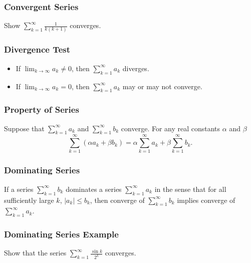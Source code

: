 \documentclass{beamer}
\begin{document}
  \begin{frame}[t]
   \frametitle{Convergent Series}
   \begin{Example}
   Show $\displaystyle\sum_{k = 1}^\infty \frac{1}{k(k + 1)}$ converges. 
   \end{Example}
  
  \end{frame}
 
 \begin{frame}
 \frametitle{Divergence Test}
 \begin{itemize}
\item If $\displaystyle\lim_{k\to\infty} a_k \neq 0$, then $\displaystyle\sum_{k = 1}^\infty a_k$ diverges.  
\item If $\displaystyle\lim_{k\to\infty} a_k =  0$, then $\displaystyle\sum_{k = 1}^\infty a_k$ may or may not converge.
\end{itemize}
 \end{frame}
 
 \begin{frame}
 \frametitle{Property of Series}
 
 \begin{Theorem} 
 Suppose that $\displaystyle\sum_{k = 1}^\infty a_k$ and $\displaystyle\sum_{k = 1}^\infty b_k$ converge. For any real constants $\alpha$ and $\beta$
 $$
 \sum_{k = 1}^\infty\left( \alpha a_k + \beta b_k\right) =   \alpha \sum_{k = 1}^\infty a_k + \beta \sum_{k = 1}^\infty b_k .
 $$
  \end{Theorem} 
 \end{frame}
 
 
 \begin{frame}
 \frametitle{Dominating Series}
 
 \begin{Theorem}
 If a series $\displaystyle\sum_{k = 1}^\infty b_k$ dominates a series $\displaystyle\sum_{k = 1}^\infty a_k$ in the sense that for all sufficiently large $k$, $|a_k| \leq b_k$, then converge of $\displaystyle\sum_{k = 1}^\infty b_k$ implies converge of $\displaystyle\sum_{k = 1}^\infty a_k$.
 \end{Theorem}
 
 \end{frame}
 
 \begin{frame}[t]
  \frametitle{Dominating Series Example}
  \begin{Example} 
  Show that the series $\displaystyle\sum_{k = 1}^\infty \frac{\sin k}{2^k}$ converges.
  \end{Example}
 
 \end{frame}
 
\end{document}
